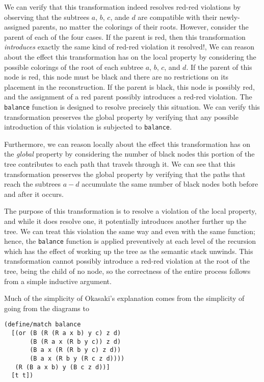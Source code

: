 \documentclass[preprint]{sigplanconf}
\begin{document}
We can verify that this transformation indeed resolves red-red violations by observing that the subtrees $a$, $b$, $c$, ande $d$ are compatible with their newly-assigned parents, no matter the colorings of their roots. However, consider the parent of each of the four cases. If the parent is red, then this transformation \emph{introduces} exactly the same kind of red-red violation it resolved!, 
We can reason about the effect this transformation has on the local property by considering the possible colorings of the root of each subtree $a$, $b$, $c$, and $d$. If the parent of this node is red, this node must be black and there are no restrictions on its placement in the reconstruction. If the parent is black, this node is possibly red, and the assignment of a red parent possibly introduces a red-red violation. The \texttt{balance} function is designed to resolve precisely this situation. We can verify this transformation preserves the global property by verifying that any possible introduction of this violation is subjected to \texttt{balance}.

Furthermore, we can reason locally about the effect this transformation has on the \emph{global} property by considering the number of black nodes this portion of the tree contributes to each path that travels through it. We can see that this transformation preserves the global property by verifying that the paths that reach the subtrees $a-d$ accumulate the same number of black nodes both before and after it occurs.

The purpose of this transformation is to resolve a violation of the local property, and while it does resolve one, it potentially introduces another further up the tree. We can treat this violation the same way and even with the same function; hence, the \texttt{balance} function is applied preventively at each level of the recursion which has the effect of working up the tree as the semantic stack unwinds. This transformation cannot possibly introduce a red-red violation at the root of the tree, being the child of no node, so the correctness of the entire process follows from a simple inductive argument.

Much of the simplicity of Okasaki's explanation comes from the simplicity of going from the diagrams to
\begin{verbatim}
(define/match balance
  [(or (B (R (R a x b) y c) z d)
       (B (R a x (R b y c)) z d)
       (B a x (R (R b y c) z d))
       (B a x (R b y (R c z d))))
   (R (B a x b) y (B c z d))]
  [t t])
\end{verbatim}
\end{document}

